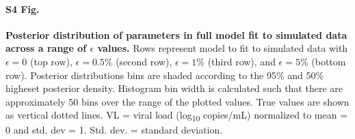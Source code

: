 \documentclass[10pt,letterpaper]{article}
\begin{document}
\paragraph*{S4 Fig.}
\label{full_simulation_sensitivity_epsilon}
{\bf Posterior distribution of parameters in full model fit to simulated data across a range of $\epsilon$ values.} Rows represent model to fit to simulated data with $\epsilon=0$ (top row), $\epsilon=0.5\%$ (second row), $\epsilon=1\%$ (third row), and $\epsilon=5\%$ (bottom row). Posterior distributions bins are shaded according to the 95\% and 50\% higheset posterior density. Histogram bin width is calculated such that there are approximately 50 bins over the range of the plotted values. True values are shown as vertical dotted lines. VL = viral load (log\textsubscript{10} copies/mL) normalized to mean = 0 and std. dev = 1. Std. dev. = standard deviation.  
\end{document}
